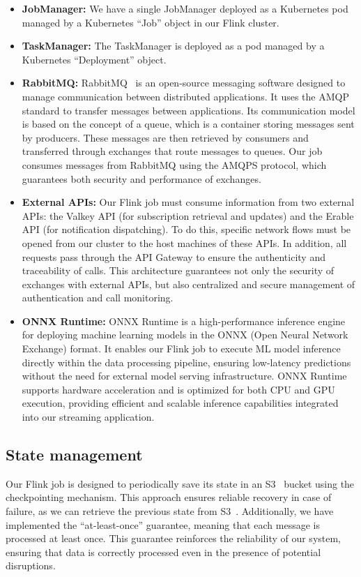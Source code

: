 \begin{itemize}
    \item[-] \textbf{JobManager:} We have a single JobManager deployed as a Kubernetes pod managed by a Kubernetes ``Job'' object in our Flink cluster.
    \item[-] \textbf{TaskManager:} The TaskManager is deployed as a pod managed by a Kubernetes ``Deployment'' object.
    \item[-] \textbf{RabbitMQ:} RabbitMQ~\cite{RBMQ} is an open-source messaging software designed to manage communication between distributed applications. It uses the AMQP standard to transfer messages between applications. Its communication model is based on the concept of a queue, which is a container storing messages sent by producers. These messages are then retrieved by consumers and transferred through exchanges that route messages to queues. Our job consumes messages from RabbitMQ using the AMQPS protocol, which guarantees both security and performance of exchanges.
    \item[-] \textbf{External APIs:} Our Flink job must consume information from two external APIs: the Valkey API (for subscription retrieval and updates) and the Erable API (for notification dispatching). To do this, specific network flows must be opened from our cluster to the host machines of these APIs. In addition, all requests pass through the API Gateway to ensure the authenticity and traceability of calls. This architecture guarantees not only the security of exchanges with external APIs, but also centralized and secure management of authentication and call monitoring.
    \item[-] \textbf{ONNX Runtime:} ONNX Runtime is a high-performance inference engine for deploying machine learning models in the ONNX (Open Neural Network Exchange) format.
    It enables our Flink job to execute ML model inference directly within the data processing pipeline, ensuring low-latency predictions without the need for external model serving infrastructure. ONNX Runtime supports hardware acceleration and is optimized for both CPU and GPU execution, providing efficient and scalable inference capabilities integrated into our streaming application.
\end{itemize}

\subsection{State management}
Our Flink job is designed to periodically save its state in an S3~\cite{s3} bucket using the checkpointing mechanism.
This approach ensures reliable recovery in case of failure, as we can retrieve the previous state from S3~\cite{s3}.
Additionally, we have implemented the ``at-least-once'' guarantee, meaning that each message is processed at least once.
This guarantee reinforces the reliability of our system, ensuring that data is correctly processed even in the presence of potential disruptions.

